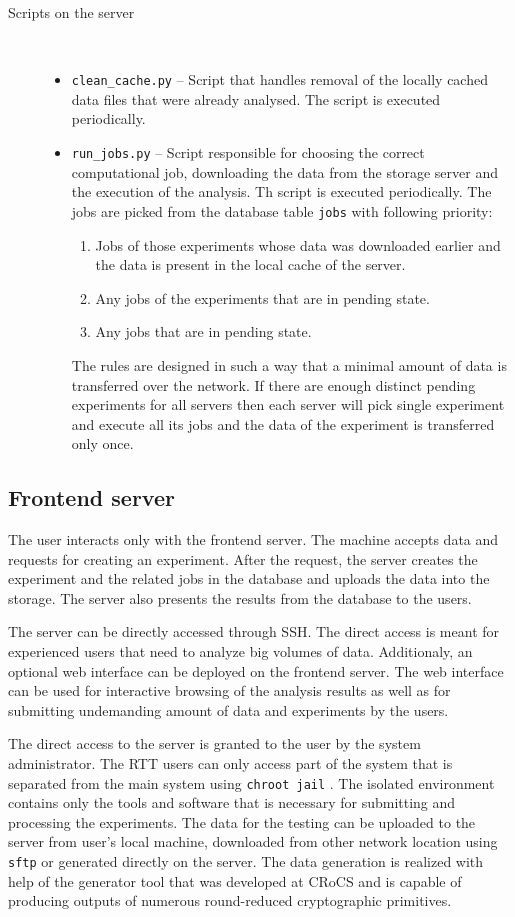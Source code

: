\documentclass[
  digital,  	%
  color,		%
  oneside,   	%
  12pt,
  nocover,
  notable,
  nolof,
  nolot,
]{fithesis3}
\newenvironment{titlemize}[1]
{
	\begin{description}
	\item[#1]\
	\begin{itemize}
}
{
	\end{itemize}
 	\end{description}
}
\theoremstyle{definition}
\theoremstyle{remark}
\begin{document}
\begin{titlemize}{Scripts on the server}
\item \texttt{clean\_cache.py} -- Script that handles removal of the locally cached data files that were already analysed. The script is executed periodically.
\item \texttt{run\_jobs.py} -- Script responsible for choosing the correct computational job, downloading the data from the storage server and the execution of the analysis. Th script is executed periodically. The jobs are picked from the database table \texttt{jobs} with following priority:
\begin{enumerate}
\item Jobs of those experiments whose data was downloaded earlier and the data is present in the local cache of the server.
\item Any jobs of the experiments that are in pending state.
\item Any jobs that are in pending state.
\end{enumerate}
The rules are designed in such a way that a minimal amount of data is transferred over the network. If there are enough distinct pending experiments for all servers then each server will pick single experiment and execute all its jobs and the data of the experiment is transferred only once.
\end{titlemize}

\subsection{Frontend server}
The user interacts only with the frontend server. The machine accepts data and requests for creating an experiment. After the request, the server creates the experiment and the related jobs in the database and uploads the data into the storage. The server also presents the results from the database to the users.

The server can be directly accessed through SSH. The direct access is meant for experienced users that need to analyze big volumes of data. Additionaly, an optional web interface can be deployed on the frontend server. The web interface can be used for interactive browsing of the analysis results as well as for submitting undemanding amount of data and experiments by the users.

The direct access to the server is granted to the user by the system administrator. The RTT users can only access part of the system that is separated from the main system using \texttt{chroot jail} \cite{chroot}. The isolated environment contains only the tools and software that is necessary for submitting and processing the experiments. The data for the testing can be uploaded to the server from user's local machine, downloaded from other network location using \texttt{sftp} or generated directly on the server. The data generation is realized with help of the generator tool \cite{eacirc-streams} that was developed at CRoCS and is capable of producing outputs of numerous round-reduced cryptographic primitives.
\end{document}
